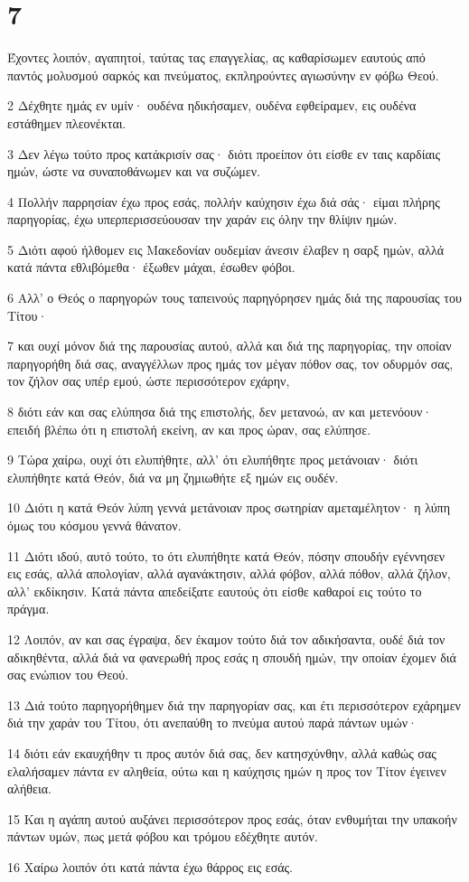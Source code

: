\chapter{7}

\par Έχοντες λοιπόν, αγαπητοί, ταύτας τας επαγγελίας, ας καθαρίσωμεν εαυτούς από παντός μολυσμού σαρκός και πνεύματος, εκπληρούντες αγιωσύνην εν φόβω Θεού.
\par 2 Δέχθητε ημάς εν υμίν· ουδένα ηδικήσαμεν, ουδένα εφθείραμεν, εις ουδένα εστάθημεν πλεονέκται.
\par 3 Δεν λέγω τούτο προς κατάκρισίν σας· διότι προείπον ότι είσθε εν ταις καρδίαις ημών, ώστε να συναποθάνωμεν και να συζώμεν.
\par 4 Πολλήν παρρησίαν έχω προς εσάς, πολλήν καύχησιν έχω διά σάς· είμαι πλήρης παρηγορίας, έχω υπερπερισσεύουσαν την χαράν εις όλην την θλίψιν ημών.
\par 5 Διότι αφού ήλθομεν εις Μακεδονίαν ουδεμίαν άνεσιν έλαβεν η σαρξ ημών, αλλά κατά πάντα εθλιβόμεθα· έξωθεν μάχαι, έσωθεν φόβοι.
\par 6 Αλλ' ο Θεός ο παρηγορών τους ταπεινούς παρηγόρησεν ημάς διά της παρουσίας του Τίτου·
\par 7 και ουχί μόνον διά της παρουσίας αυτού, αλλά και διά της παρηγορίας, την οποίαν παρηγορήθη διά σας, αναγγέλλων προς ημάς τον μέγαν πόθον σας, τον οδυρμόν σας, τον ζήλον σας υπέρ εμού, ώστε περισσότερον εχάρην,
\par 8 διότι εάν και σας ελύπησα διά της επιστολής, δεν μετανοώ, αν και μετενόουν· επειδή βλέπω ότι η επιστολή εκείνη, αν και προς ώραν, σας ελύπησε.
\par 9 Τώρα χαίρω, ουχί ότι ελυπήθητε, αλλ' ότι ελυπήθητε προς μετάνοιαν· διότι ελυπήθητε κατά Θεόν, διά να μη ζημιωθήτε εξ ημών εις ουδέν.
\par 10 Διότι η κατά Θεόν λύπη γεννά μετάνοιαν προς σωτηρίαν αμεταμέλητον· η λύπη όμως του κόσμου γεννά θάνατον.
\par 11 Διότι ιδού, αυτό τούτο, το ότι ελυπήθητε κατά Θεόν, πόσην σπουδήν εγέννησεν εις εσάς, αλλά απολογίαν, αλλά αγανάκτησιν, αλλά φόβον, αλλά πόθον, αλλά ζήλον, αλλ' εκδίκησιν. Κατά πάντα απεδείξατε εαυτούς ότι είσθε καθαροί εις τούτο το πράγμα.
\par 12 Λοιπόν, αν και σας έγραψα, δεν έκαμον τούτο διά τον αδικήσαντα, ουδέ διά τον αδικηθέντα, αλλά διά να φανερωθή προς εσάς η σπουδή ημών, την οποίαν έχομεν διά σας ενώπιον του Θεού.
\par 13 Διά τούτο παρηγορήθημεν διά την παρηγορίαν σας, και έτι περισσότερον εχάρημεν διά την χαράν του Τίτου, ότι ανεπαύθη το πνεύμα αυτού παρά πάντων υμών·
\par 14 διότι εάν εκαυχήθην τι προς αυτόν διά σας, δεν κατησχύνθην, αλλά καθώς σας ελαλήσαμεν πάντα εν αληθεία, ούτω και η καύχησις ημών η προς τον Τίτον έγεινεν αλήθεια.
\par 15 Και η αγάπη αυτού αυξάνει περισσότερον προς εσάς, όταν ενθυμήται την υπακοήν πάντων υμών, πως μετά φόβου και τρόμου εδέχθητε αυτόν.
\par 16 Χαίρω λοιπόν ότι κατά πάντα έχω θάρρος εις εσάς.

